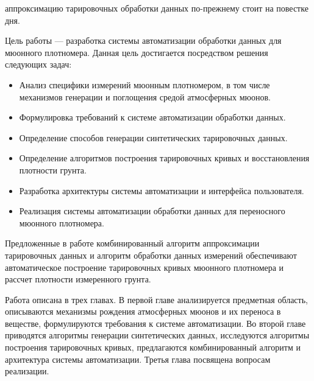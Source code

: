аппроксимацию тарировочных %
 обработки данных по-прежнему стоит на повестке дня.

Цель работы --- разработка системы автоматизации обработки данных для мюонного плотномера. 
Данная цель достигается посредством решения следующих задач:

\begin{itemize}
 \item Анализ специфики измерений мюонным плотномером, в том числе механизмов генерации и поглощения средой атмосферных мюонов.
 \item Формулировка требований к системе автоматизации обработки данных.
 \item Определение способов генерации синтетических тарировочных данных. 
 \item Определение алгоритмов построения тарировочных кривых и  восстановления плотности грунта.
 \item Разработка архитектуры системы автоматизации и интерфейса пользователя.
 \item Реализация системы автоматизации обработки данных для переносного мюонного плотномера.
\end{itemize}

Предложенные в работе комбинированный алгоритм аппроксимации тарировочных данных и алгоритм обработки данных измерений
обеспечивают автоматическое построение тарировочных кривых мюонного плотномера и рассчет плотности измеренного грунта.

Работа описана в трех главах. В первой главе анализируется предметная область, описываются механизмы рождения атмосферных мюонов и их переноса в веществе,
 формулируются требования к системе автоматизации. Во второй главе приводятся алгоритмы генерации синтетических данных, 
 исследуются  алгоритмы построения тарировочных кривых, предлагаются комбинированный алгоритм и архитектура системы автоматизации.
 Третья глава посвящена вопросам реализации. 

\clearpage
